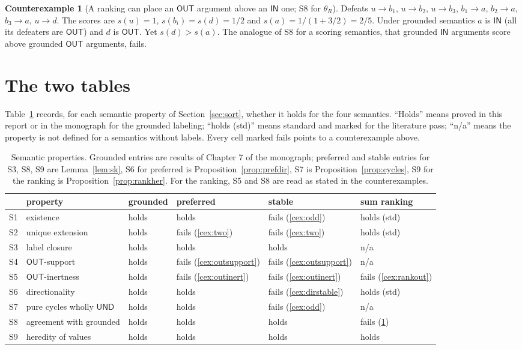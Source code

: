 \documentclass[11pt]{article}
\theoremstyle{plain}
\theoremstyle{definition}
\newtheorem{counterexample}{Counterexample}
\theoremstyle{remark}
\newcommand{\IN}{\textsf{IN}}
\newcommand{\OUT}{\textsf{OUT}}
\newcommand{\UND}{\textsf{UND}}
\begin{document}
\begin{counterexample}[A ranking can place an $\OUT$ argument above an $\IN$ one; S8 for $\theta_R$]\label{cex:rankground}
Defeats $u\to b_1$, $u\to b_2$, $u\to b_3$, $b_1\to a$, $b_2\to a$, $b_3\to a$, $u\to d$. The scores are $s(u)=1$, $s(b_i)=s(d)=1/2$ and $s(a)=1/(1+3/2)=2/5$. Under grounded semantics $a$ is $\IN$ (all its defeaters are $\OUT$) and $d$ is $\OUT$. Yet $s(d)>s(a)$. The analogue of S8 for a scoring semantics, that grounded $\IN$ arguments score above grounded $\OUT$ arguments, fails.
\end{counterexample}

\section{The two tables}\label{sec:tables}

Table~\ref{tab:sem} records, for each semantic property of Section~\ref{sec:sort}, whether it holds for the four semantics. ``Holds'' means proved in this report or in the monograph for the grounded labeling; ``holds (std)'' means standard and marked for the literature pass; ``n/a'' means the property is not defined for a semantics without labels. Every cell marked fails points to a counterexample above.

\begin{table}[h]
\centering
\small
\begin{tabularx}{\textwidth}{@{}l>{\raggedright\arraybackslash}X llll@{}}
\toprule
& property & grounded & preferred & stable & sum ranking\\
\midrule
S1 & existence & holds & holds & fails (\ref{cex:odd}) & holds (std)\\
S2 & unique extension & holds & fails (\ref{cex:two}) & fails (\ref{cex:two}) & holds (std)\\
S3 & label closure & holds & holds & holds & n/a\\
S4 & $\OUT$-support & holds & fails (\ref{cex:outsupport}) & fails (\ref{cex:outsupport}) & n/a\\
S5 & $\OUT$-inertness & holds & fails (\ref{cex:outinert}) & fails (\ref{cex:outinert}) & fails (\ref{cex:rankout})\\
S6 & directionality & holds & holds & fails (\ref{cex:dirstable}) & holds (std)\\
S7 & pure cycles wholly $\UND$ & holds & holds & fails (\ref{cex:odd}) & n/a\\
S8 & agreement with grounded & holds & holds & holds & fails (\ref{cex:rankground})\\
S9 & heredity of values & holds & holds & holds & holds\\
\bottomrule
\end{tabularx}
\caption{Semantic properties. Grounded entries are results of Chapter 7 of the monograph; preferred and stable entries for S3, S8, S9 are Lemma~\ref{lem:sk}, S6 for preferred is Proposition~\ref{prop:prefdir}, S7 is Proposition~\ref{prop:cycles}, S9 for the ranking is Proposition~\ref{prop:rankher}. For the ranking, S5 and S8 are read as stated in the counterexamples.}
\label{tab:sem}
\end{table}
\end{document}
